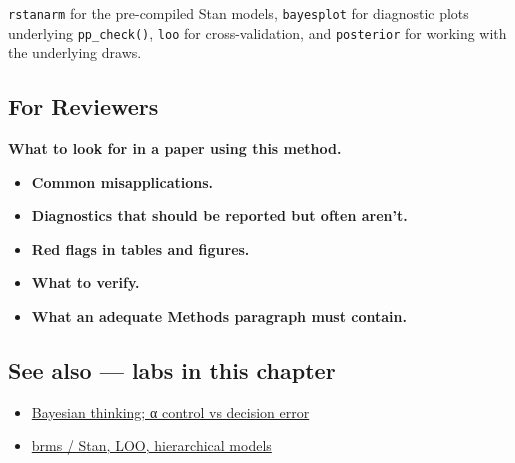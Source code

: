 \documentclass[
]{article}
\providecommand{\tightlist}{%
  \setlength{\itemsep}{0pt}\setlength{\parskip}{0pt}}
\begin{document}
\texttt{rstanarm} for the pre-compiled Stan models, \texttt{bayesplot}
for diagnostic plots underlying \texttt{pp\_check()}, \texttt{loo} for
cross-validation, and \texttt{posterior} for working with the underlying
draws.

\subsection{For Reviewers}\label{for-reviewers}

\textbf{What to look for in a paper using this method.}

\begin{itemize}
\tightlist
\item
  \textbf{Common misapplications.}
\item
  \textbf{Diagnostics that should be reported but often aren't.}
\item
  \textbf{Red flags in tables and figures.}
\item
  \textbf{What to verify.}
\item
  \textbf{What an adequate Methods paragraph must contain.}
\end{itemize}

\subsection{See also --- labs in this
chapter}\label{see-also-labs-in-this-chapter}

\begin{itemize}
\tightlist
\item
  \href{labs/lab-bayesian-thinking-control-vs-decision-error.Rmd}{Bayesian
  thinking; α control vs decision error}
\item
  \href{labs/lab-brms-stan-loo-hierarchical-models.Rmd}{brms / Stan,
  LOO, hierarchical models}
\end{itemize}
\end{document}
